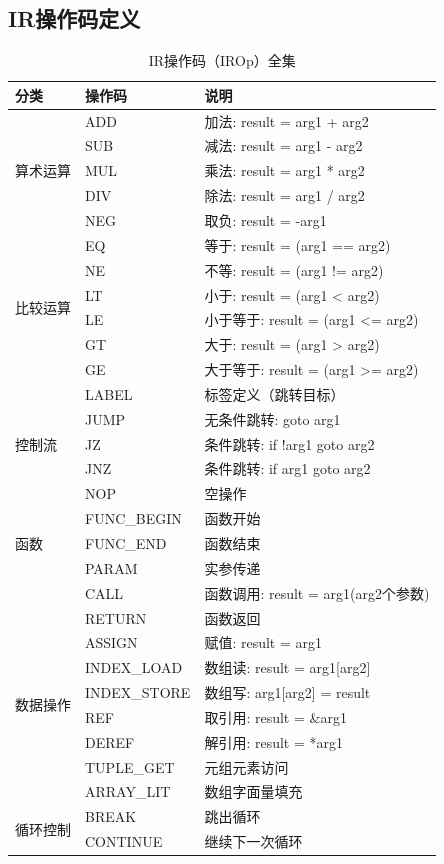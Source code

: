\documentclass[12pt,a4paper]{ctexart}
\begin{document}
\subsection{IR操作码定义}

\begin{table}[H]
\centering
\caption{IR操作码（IROp）全集}
\begin{tabular}{|l|l|l|}
\hline
\textbf{分类} & \textbf{操作码} & \textbf{说明} \\
\hline
\multirow{5}{*}{算术运算} & ADD & 加法: result = arg1 + arg2 \\
& SUB & 减法: result = arg1 - arg2 \\
& MUL & 乘法: result = arg1 * arg2 \\
& DIV & 除法: result = arg1 / arg2 \\
& NEG & 取负: result = -arg1 \\
\hline
\multirow{6}{*}{比较运算} & EQ & 等于: result = (arg1 == arg2) \\
& NE & 不等: result = (arg1 != arg2) \\
& LT & 小于: result = (arg1 < arg2) \\
& LE & 小于等于: result = (arg1 <= arg2) \\
& GT & 大于: result = (arg1 > arg2) \\
& GE & 大于等于: result = (arg1 >= arg2) \\
\hline
\multirow{5}{*}{控制流} & LABEL & 标签定义（跳转目标） \\
& JUMP & 无条件跳转: goto arg1 \\
& JZ & 条件跳转: if !arg1 goto arg2 \\
& JNZ & 条件跳转: if arg1 goto arg2 \\
& NOP & 空操作 \\
\hline
\multirow{3}{*}{函数} & FUNC\_BEGIN & 函数开始 \\
& FUNC\_END & 函数结束 \\
& PARAM & 实参传递 \\
& CALL & 函数调用: result = arg1(arg2个参数) \\
& RETURN & 函数返回 \\
\hline
\multirow{6}{*}{数据操作} & ASSIGN & 赋值: result = arg1 \\
& INDEX\_LOAD & 数组读: result = arg1[arg2] \\
& INDEX\_STORE & 数组写: arg1[arg2] = result \\
& REF & 取引用: result = \&arg1 \\
& DEREF & 解引用: result = *arg1 \\
& TUPLE\_GET & 元组元素访问 \\
& ARRAY\_LIT & 数组字面量填充 \\
\hline
\multirow{2}{*}{循环控制} & BREAK & 跳出循环 \\
& CONTINUE & 继续下一次循环 \\
\hline
\end{tabular}
\end{table}
\end{document}
